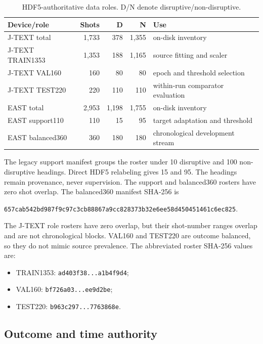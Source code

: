 \documentclass[10pt]{article}
\newcommand{\jtext}{J-TEXT}
\newcommand{\east}{EAST}
\newcommand{\code}[1]{\nolinkurl{#1}}
\begin{document}
\begin{table}[h]
\centering
\caption{HDF5-authoritative data roles. D/N denote disruptive/non-disruptive.}
\begin{tabular}{lrrrl}
\toprule
Device/role & Shots & D & N & Use \\
\midrule
\jtext{} total & 1,733 & 378 & 1,355 & on-disk inventory \\
\jtext{} TRAIN1353 & 1,353 & 188 & 1,165 & source fitting and scaler \\
\jtext{} VAL160 & 160 & 80 & 80 & epoch and threshold selection \\
\jtext{} TEST220 & 220 & 110 & 110 & within-run comparator evaluation \\
\east{} total & 2,953 & 1,198 & 1,755 & on-disk inventory \\
\east{} support110 & 110 & 15 & 95 & target adaptation and threshold \\
\east{} balanced360 & 360 & 180 & 180 & chronological development stream \\
\bottomrule
\end{tabular}
\end{table}

The legacy support manifest groups the roster under 10 disruptive and 100 non-disruptive headings.  Direct HDF5 relabeling gives 15 and 95.  The headings remain provenance, never supervision.  The support and balanced360 rosters have zero shot overlap.  The balanced360 manifest SHA-256 is
\begin{center}
\code{657cab542bd987f9c97c3cb88867a9cc828373b32e6ee58d450451461c6ec825}.
\end{center}
The \jtext{} role rosters have zero overlap, but their shot-number ranges overlap and are not chronological blocks.  VAL160 and TEST220 are outcome balanced, so they do not mimic source prevalence.  The abbreviated roster SHA-256 values are:
\begin{itemize}[nosep,leftmargin=1.5em]
  \item TRAIN1353: \code{ad403f38...a1b4f9d4};
  \item VAL160: \code{bf726a03...ee9d2be};
  \item TEST220: \code{b963c297...7763868e}.
\end{itemize}

\subsection{Outcome and time authority}
\end{document}
